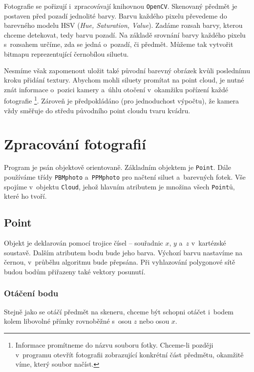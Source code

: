 \documentclass[12pt]{report}			%
\begin{document}
                Fotografie se pořizují i~zpracovávají knihovnou \verb|OpenCV|. Skenovaný předmět je postaven před pozadí jednolité barvy. Barvu každého pixelu převedeme do barevného modelu HSV (\emph{Hue, Saturation, Value}). Zadáme rozsah barvy, kterou chceme detekovat, tedy barvu pozadí. Na základě srovnání barvy každého pixelu s~rozsahem určíme, zda se jedná o~pozadí, či předmět. Můžeme tak vytvořit bitmapu reprezentující černobílou siluetu.

                Nesmíme však zapomenout uložit také původní barevný obrázek kvůli poslednímu kroku přidání textury. Abychom mohli siluety promítat na point cloud, je nutné znát informace o~pozici kamery a~úhlu otočení v~okamžiku pořízení každé fotografie \footnote{Informace promítneme do názvu souboru fotky. Chceme-li později v~programu otevřít fotografii zobrazující konkrétní část předmětu, okamžitě víme, který soubor načíst.}. Zároveň je předpokládáno (pro jednoduchost výpočtu), že kamera vždy směřuje do středu původního point cloudu tvaru kvádru.

            \section{Zpracování fotografií}

                Program je psán objektově orientovaně. Základním objektem je \verb|Point|. Dále používáme třídy \verb|PBMphoto| a~\verb|PPMphoto| pro načtení siluet a~barevných fotek. Vše spojíme v~objektu \verb|Cloud|, jehož hlavním atributem je množina všech \verb|Point|ů, které ho tvoří.

                \subsection{Point}

                    Objekt je deklarován pomocí trojice čísel -- souřadnic $x$, $y$ a~$z$ v~kartézské soustavě. Dalším atributem bodu bude jeho barva. Výchozí barvu nastavíme na černou, v~průběhu algoritmu bude přepsána. Při vyhlazování polygonové sítě budou bodům přiřazeny také vektory posunutí.

                    \subsubsection{Otáčení bodu}
                        
                        Stejně jako se otáčí předmět na skeneru, chceme být schopni otáčet i~bodem kolem libovolné přímky rovnoběžné s~osou $z$ nebo osou $x$.
\end{document}
